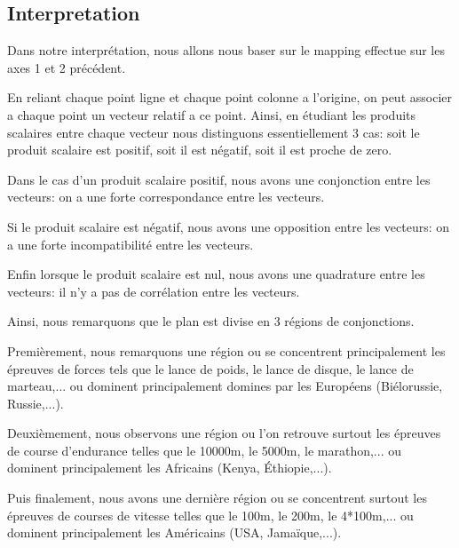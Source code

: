 \documentclass{article}
\begin{document}
\subsection{Interpretation}

Dans notre interprétation, nous allons nous baser sur le mapping effectue sur les axes 1 et 2 précédent.
\newline

En reliant chaque point ligne et chaque point colonne a l'origine, on peut associer a chaque point un vecteur relatif a ce point. Ainsi, en étudiant les produits scalaires entre chaque vecteur nous distinguons essentiellement 3 cas: soit le produit scalaire est positif, soit il est négatif, soit il est proche de zero.
\newline

Dans le cas d'un produit scalaire positif, nous avons une conjonction entre les vecteurs: on a une forte correspondance entre les vecteurs.
\newline

Si le produit scalaire est négatif, nous avons une opposition entre les vecteurs: on a une forte incompatibilité entre les vecteurs.
\newline

Enfin lorsque le produit scalaire est nul, nous avons une quadrature entre les vecteurs: il n'y a pas de corrélation entre les vecteurs.
\newline

Ainsi, nous remarquons que le plan est divise en 3 régions de conjonctions.
\newline

Premièrement, nous remarquons une région ou se concentrent principalement les épreuves de forces tels que le lance de poids, le lance de disque, le lance de marteau,... ou dominent principalement domines par les Européens (Biélorussie, Russie,...).
\newline

Deuxièmement, nous observons une région ou l'on retrouve surtout les épreuves de course d'endurance telles que le 10000m, le 5000m, le marathon,... ou dominent principalement les Africains (Kenya, Éthiopie,...).
\newline

Puis finalement, nous avons une dernière région ou se concentrent surtout les épreuves de courses de vitesse telles que le 100m, le 200m, le 4*100m,... ou dominent principalement les Américains (USA, Jamaïque,...).
\newline
\end{document}
